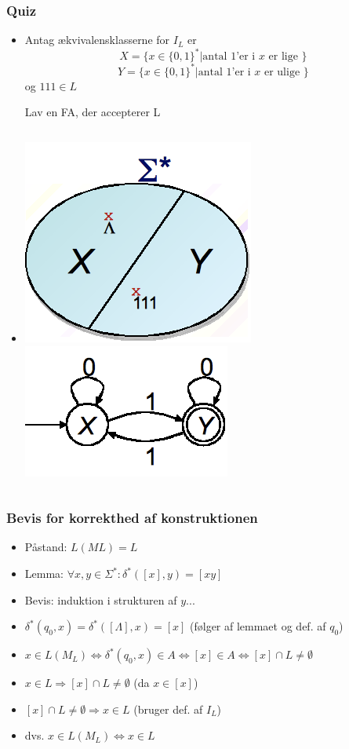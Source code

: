 \documentclass[]{beamer}
\begin{document}
\begin{frame}
\frametitle{Quiz}
\begin{itemize}[<+->]
\item Antag ækvivalensklasserne for $I_L$ er 
\[X = \{x\in \{0,1\}^* | \text{antal 1’er i } x \text{ er lige } \}\]
\[Y = \{x\in \{0,1\}^* | \text{antal 1’er i } x \text{ er ulige } \}\]
og $111\in L$

Lav en FA, der accepterer L
\item
\begin{columns}
\column{5cm}
\includegraphics[scale=0.4]{images/2_seminar_equivclassesodd}
\column{5cm}\pause
\includegraphics[scale=0.4]{images/2_seminar_odd1}
\end{columns}
\end{itemize}
\end{frame}

\begin{frame}
\frametitle{Bevis for korrekthed af konstruktionen}
\begin{itemize}[<+->]
\item Påstand: $L(ML) = L$
\item Lemma:  $\forall x,y\in \Sigma^*:   \delta^*([x], y) = [xy]$
\item Bevis: induktion i strukturen af $y$...
\item $\delta^*(q_0, x) = \delta^*([\Lambda ], x) = [x]$  (følger af lemmaet og def. af $q_0$)
\item $x\in L(M_L)\Leftrightarrow\delta^*(q_0, x)\in A\Leftrightarrow [x]\in A\Leftrightarrow [x] \cap L 
\neq \emptyset$
\item $x\in L  \Rightarrow   [x] \cap  L \neq  \emptyset $   (da $x\in [x]$)
\item $[x] \cap  L \neq  \emptyset  \Rightarrow   x\in L$    (bruger def. af $I_L$)
\item dvs.  $x\in L(M_L)  \Leftrightarrow  x\in L$
\end{itemize}
\end{frame}
\end{document}
